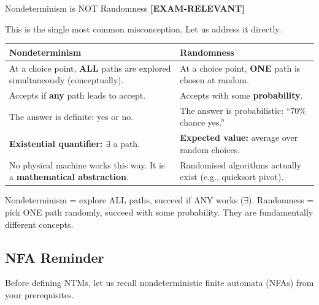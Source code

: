 \documentclass[11pt,a4paper]{article}
\newcommand{\kemark}{\textcolor{red!70!black}{\textbf{[EXAM-RELEVANT]}}}
\newcommand{\kt}[1]{\par\vspace{0.3em}\colorbox{yellow!60}{\parbox{\dimexpr\linewidth-2\fboxsep}{#1}}\vspace{0.3em}}
\begin{document}
\begin{conceptbox}{Nondeterminism is NOT Randomness \kemark}

This is the single most common misconception. Let us address it directly.

\begin{center}
\begin{tabular}{p{5.5cm}p{5.5cm}}
\toprule
\textbf{Nondeterminism} & \textbf{Randomness} \\
\midrule
At a choice point, \textbf{ALL} paths are explored simultaneously (conceptually). & At a choice point, \textbf{ONE} path is chosen at random. \\[0.5em]
Accepts if \textbf{any} path leads to accept. & Accepts with some \textbf{probability}. \\[0.5em]
The answer is definite: yes or no. & The answer is probabilistic: ``70\% chance yes.'' \\[0.5em]
\textbf{Existential quantifier:} $\exists$ a path. & \textbf{Expected value:} average over random choices. \\[0.5em]
No physical machine works this way. It is a \textbf{mathematical abstraction}. & Randomised algorithms actually exist (e.g., quicksort pivot). \\
\bottomrule
\end{tabular}
\end{center}

\kt{Nondeterminism = explore ALL paths, succeed if ANY works ($\exists$). Randomness = pick ONE path randomly, succeed with some probability. They are fundamentally different concepts.}
\end{conceptbox}

\subsection{NFA Reminder}

Before defining NTMs, let us recall nondeterministic finite automata (NFAs) from your prerequisites.
\end{document}
